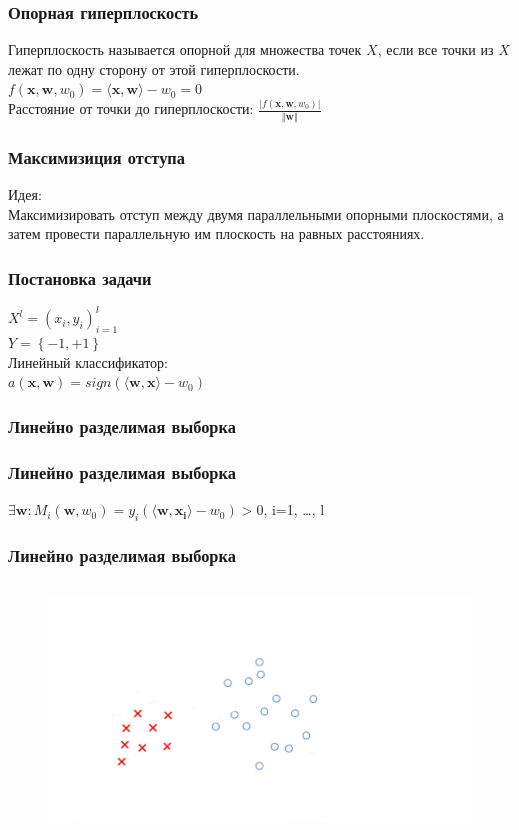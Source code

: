 \documentclass[12pt]{beamer}
\begin{document}
\begin{frame}\frametitle{Опорная гиперплоскость}
Гиперплоскость называется опорной для множества точек
$X$, если все точки из $X$ лежат по одну сторону от этой гиперплоскости.\\\vspace{5mm}
${f(\mathbf{x},\mathbf{w}, w_0) = \langle \mathbf{x}, \mathbf{w}\rangle - w_0 = 0}$\\
\vspace{5mm}
Расстояние от точки до гиперплоскости:
$\frac{\vert f(\mathbf{x},\mathbf{w}, w_0) \vert}{\Vert \mathbf{w} \Vert}$
\end{frame}

\begin{frame}\frametitle{Максимизиция отступа}
Идея:\\
Максимизировать отступ между двумя параллельными опорными плоскостями, а затем провести параллельную им плоскость на равных расстояниях.\\
\end{frame}

\begin{frame}\frametitle{Постановка задачи}
${X^l = (x_i,y_i)_{i = 1}^l}$\\ 
${Y=\left\{-1,+1\right\}}$\\
\vspace{5mm}
Линейный классификатор:\\
$a(\mathbf{x}, \mathbf{w}) = sign(\langle \mathbf{w}, \mathbf{x}\rangle - w_0)$\\
\end{frame}


\begin{frame}\frametitle{Линейно разделимая выборка}
\end{frame}

\begin{frame}\frametitle{Линейно разделимая выборка}
$\exists \mathbf{w}: M_i(\mathbf{w}, w_0) = y_i  (\langle \mathbf{w}, \mathbf{x_i} \rangle - w_0) > 0$, i=1, \dots , l\\
\end{frame}

\begin{frame}\frametitle{Линейно разделимая выборка}
\begin{figure}[htbp]
  \includegraphics[height=190pt, keepaspectratio = true]{images/linearly_separable1}   
\end{figure}
\end{frame}
\end{document}
